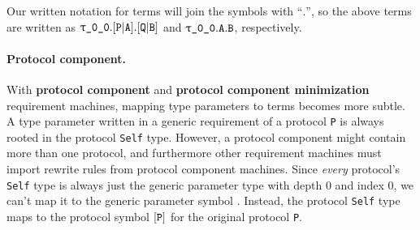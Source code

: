 \documentclass[../generics]{subfiles}
\begin{document}
\begin{quote}
\end{quote}
Our written notation for terms will join the symbols with ``$.$'', so the above terms are written as $\ttgp{0}{0}.\assocsym{P}{A}.\assocsym{Q}{B}$ and $\ttgp{0}{0}.\texttt{A}.\texttt{B}$, respectively.

\paragraph{Protocol component.}
%
%
With \textbf{protocol component} and \textbf{protocol component minimization} requirement machines, mapping type parameters to terms becomes more subtle. A type parameter written in a generic requirement of a protocol \texttt{P} is always rooted in the protocol \texttt{Self} type. However, a protocol component might contain more than one protocol, and furthermore other requirement machines must import rewrite rules from protocol component machines. Since \emph{every} protocol's \texttt{Self} type is always just the generic parameter type  with depth 0 and index 0, we can't map it to the generic parameter symbol . Instead, the protocol \texttt{Self} type maps to the protocol symbol $[\texttt{P}]$ for the original protocol \texttt{P}.
\end{document}

